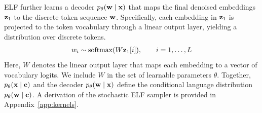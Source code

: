 ELF further learns a decoder $p_\theta({\mathbf{w}} \mid {\mathbf{x}})$ that maps the final denoised embeddings ${\mathbf{z}}_1$ to the discrete token sequence ${\mathbf{w}}$. Specifically, each embedding in ${\mathbf{z}}_1$ is projected to the token vocabulary through a linear output layer, yielding a distribution over discrete tokens.
\begin{align}
w_i \sim \mathrm{softmax}(W {\mathbf{z}}_{1}[i]), \qquad i=1, \ldots, L
\end{align}
Here, $W$ denotes the linear output layer that maps each embedding to a vector of vocabulary logits. We include $W$ in the set of learnable parameters $\theta$. Together, $p_\theta({\mathbf{x}}\mid{\mathbf{c}})$ and the decoder $p_\theta({\mathbf{w}}\mid{\mathbf{x}})$ define the conditional language distribution $p_\theta({\mathbf{w}}\mid{\mathbf{c}})$. A derivation of the stochastic ELF sampler is provided in Appendix~\ref{app:kernels}.



